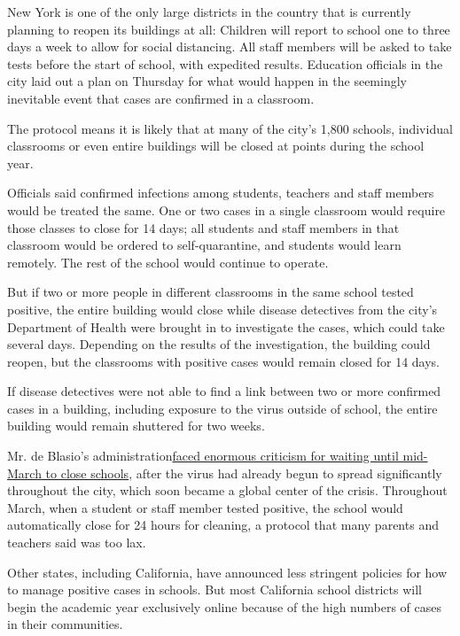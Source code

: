 New York is one of the only large districts in the country that is
currently planning to reopen its buildings at all: Children will report
to school one to three days a week to allow for social distancing. All
staff members will be asked to take tests before the start of school,
with expedited results. Education officials in the city laid out a plan
on Thursday for what would happen in the seemingly inevitable event that
cases are confirmed in a classroom.

The protocol means it is likely that at many of the city's 1,800
schools, individual classrooms or even entire buildings will be closed
at points during the school year.

Officials said confirmed infections among students, teachers and staff
members would be treated the same. One or two cases in a single
classroom would require those classes to close for 14 days; all students
and staff members in that classroom would be ordered to self-quarantine,
and students would learn remotely. The rest of the school would continue
to operate.

But if two or more people in different classrooms in the same school
tested positive, the entire building would close while disease
detectives from the city's Department of Health were brought in to
investigate the cases, which could take several days. Depending on the
results of the investigation, the building could reopen, but the
classrooms with positive cases would remain closed for 14 days.

If disease detectives were not able to find a link between two or more
confirmed cases in a building, including exposure to the virus outside
of school, the entire building would remain shuttered for two weeks.

Mr. de Blasio's
administration\href{https://www.nytimes3xbfgragh.onion/2020/07/06/nyregion/nyc-school-reopening-plan.html}{faced
enormous criticism for waiting until mid-March to close schools}, after
the virus had already begun to spread significantly throughout the city,
which soon became a global center of the crisis. Throughout March, when
a student or staff member tested positive, the school would
automatically close for 24 hours for cleaning, a protocol that many
parents and teachers said was too lax.

Other states, including California, have announced less stringent
policies for how to manage positive cases in schools. But most
California school districts will begin the academic year exclusively
online because of the high numbers of cases in their communities.

